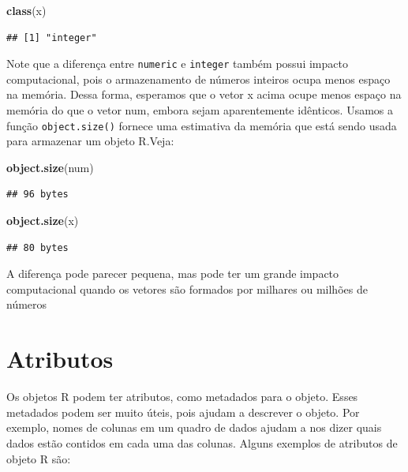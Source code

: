 \documentclass[]{book}
\newenvironment{Shaded}{\begin{snugshade}}{\end{snugshade}}
\newcommand{\KeywordTok}[1]{\textcolor[rgb]{0.13,0.29,0.53}{\textbf{#1}}}
\newcommand{\NormalTok}[1]{#1}
\begin{document}
\begin{Shaded}
\begin{Highlighting}[]
\KeywordTok{class}\NormalTok{(x)}
\end{Highlighting}
\end{Shaded}

\begin{verbatim}
## [1] "integer"
\end{verbatim}

Note que a diferença entre \texttt{numeric} e \texttt{integer} também possui impacto computacional, pois o armazenamento de números inteiros ocupa menos espaço na memória. Dessa forma, esperamos que o vetor x acima ocupe menos espaço na memória do que o vetor num, embora sejam aparentemente idênticos. Usamos a função \texttt{object.size()} fornece uma estimativa da memória que está sendo usada para armazenar um objeto R.Veja:

\begin{Shaded}
\begin{Highlighting}[]
\KeywordTok{object.size}\NormalTok{(num)}
\end{Highlighting}
\end{Shaded}

\begin{verbatim}
## 96 bytes
\end{verbatim}

\begin{Shaded}
\begin{Highlighting}[]
\KeywordTok{object.size}\NormalTok{(x)}
\end{Highlighting}
\end{Shaded}

\begin{verbatim}
## 80 bytes
\end{verbatim}

A diferença pode parecer pequena, mas pode ter um grande impacto computacional quando os vetores são formados por milhares ou milhões de números

\hypertarget{atributos}{%
\section{Atributos}\label{atributos}}

Os objetos R podem ter atributos, como metadados para o objeto. Esses metadados podem ser muito úteis, pois ajudam a descrever o objeto. Por exemplo, nomes de colunas em um quadro de dados ajudam a nos dizer quais dados estão contidos em cada uma das colunas. Alguns exemplos de atributos de objeto R são:
\end{document}
